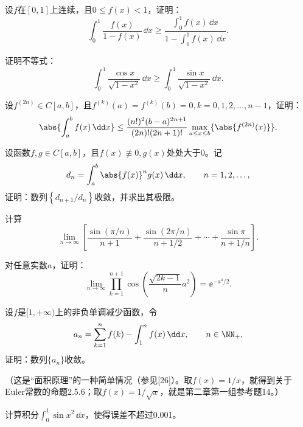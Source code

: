 \begin{xreferenceproblem}[4]
设$f$在$[0,1]$上连续，且$0\le f(x)<1$，证明：
  \[
    \int_0^1\frac{f(x)}{1-f(x)}\,\dd x
    \ge\frac{\int_0^1f(x)\,\dd x}{1-\int_0^1f(x)\,\dd x}.
  \]
\end{xreferenceproblem}

\begin{xreferenceproblem}[5]
证明不等式：
  \[
    \int_0^1\frac{\cos x}{\sqrt{1-x^2}}\,\dd x
    \ge\int_0^1\frac{\sin x}{\sqrt{1-x^2}}\,\dd x.
  \]
\end{xreferenceproblem}

\begin{xreferenceproblem}[6]
设$f^{(2n)}\in C[a,b]$，且$f^{(k)}(a)=f^{(k)}(b)=0,k=0,1,2,\ldots,n-1$，证明：
  \[
    \abs{\int_a^bf(x)\,\dd x}
    \le\frac{(n!)^2(b-a)^{2n+1}}{(2n)!(2n+1)!}
    \max_{a\le x\le b}\{\abs{f^{(2n)}(x)}\}.
  \]
\end{xreferenceproblem}

\begin{xreferenceproblem}[7]
设函数$f,g\in C[a,b]$，且$f(x)\not\equiv0,g(x)$处处大于0。记
  \[
    d_n=\int_a^b\abs{f(x)}^ng(x)\,\dd x,\qquad n=1,2,\ldots,
  \]
  证明：数列$\left\{d_{n+1}/d_n\right\}$收敛，并求出其极限。
\end{xreferenceproblem}

\begin{xreferenceproblem}[8]
计算
  \[
    \lim_{n\to\infty}\left[
    \frac{\sin(\pi/n)}{n+1}
    +\frac{\sin(2\pi/n)}{n+1/2}
    +\cdots+
    \frac{\sin\pi}{n+1/n}
    \right].
  \]
\end{xreferenceproblem}

\begin{xreferenceproblem}[9]
对任意实数$a$，证明：
  \[
    \lim_{n\to\infty}\prod_{k=1}^{n+1}
    \cos\left(\frac{\sqrt{2k-1}}{n}a^2\right)
    =\ee^{-a^4/2}.
  \]
\end{xreferenceproblem}

\begin{xreferenceproblem}[10]
设$f$是$[1,+\infty)$上的非负单调减少函数，令
  \[
    a_n=\sum_{k=1}^nf(k)-\int_1^nf(x)\,\dd x,\qquad n\in\NN_+,
  \]
  证明：数列$\{a_n\}$收敛。

  （这是“面积原理”的一种简单情况（参见[26]）。取$f(x)=1/x$，就得到关于Euler常数的命题2.5.6；取$f(x)=1/\sqrt x$，就是第二章第一组参考题14。）
\end{xreferenceproblem}

\begin{xreferenceproblem}[11]
计算积分$\int_0^1\sin x^2\,\dd x$，使得误差不超过0.001。
\end{xreferenceproblem}

